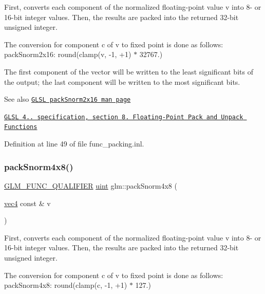 First, converts each component of the normalized floating-\/point value v into 8-\/ or 16-\/bit integer values. Then, the results are packed into the returned 32-\/bit unsigned integer.

The conversion for component c of v to fixed point is done as follows\+: pack\+Snorm2x16\+: round(clamp(v, -\/1, +1) $\ast$ 32767.)

The first component of the vector will be written to the least significant bits of the output; the last component will be written to the most significant bits.

\begin{DoxySeeAlso}{See also}
\href{http://www.opengl.org/sdk/docs/manglsl/xhtml/packSnorm2x16.xml}{\tt G\+L\+SL pack\+Snorm2x16 man page} 

\href{http://www.opengl.org/registry/doc/GLSLangSpec.4.20.8.pdf}{\tt G\+L\+SL 4.. specification, section 8. Floating-\/\+Point Pack and Unpack Functions} 
\end{DoxySeeAlso}


Definition at line 49 of file func\+\_\+packing.\+inl.

\mbox{\label{group__core__func__packing_gafcf25acc0d361c6c696a433aa5dfd16b}} 
\subsubsection{\texorpdfstring{pack\+Snorm4x8()}{packSnorm4x8()}}
{\footnotesize\ttfamily \hyperlink{setup_8hpp_a33fdea6f91c5f834105f7415e2a64407}{G\+L\+M\+\_\+\+F\+U\+N\+C\+\_\+\+Q\+U\+A\+L\+I\+F\+I\+ER} \hyperlink{group__core__precision_ga4fd29415871152bfb5abd588334147c8}{uint} glm\+::pack\+Snorm4x8 (\begin{DoxyParamCaption}\item[{\hyperlink{group__core__types_ga5881b1b022d7fd1b7218f5916532dd02}{vec4} const \&}]{v }\end{DoxyParamCaption})}

First, converts each component of the normalized floating-\/point value v into 8-\/ or 16-\/bit integer values. Then, the results are packed into the returned 32-\/bit unsigned integer.

The conversion for component c of v to fixed point is done as follows\+: pack\+Snorm4x8\+: round(clamp(c, -\/1, +1) $\ast$ 127.)

